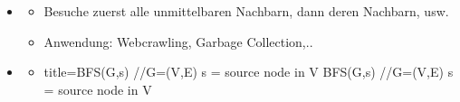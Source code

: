\documentclass[
    12pt,
    a4paper,
    ngerman,
    color=3b,%
    marginpar=false,
    colorback=false,
    leqno,
]{tudaexercise}
\begin{document}
    \begin{itemize}
        \item {}
            \begin{itemize}
                \item Besuche zuerst alle unmittelbaren Nachbarn, dann deren Nachbarn, usw.
                \item Anwendung: Webcrawling, Garbage Collection,..
            \end{itemize}
        
        \item {}
            \begin{itemize}
                \item[]
                    \begin{ccode}[autogobble,escapeinside=||]{title={BFS(G,s) //G=(V,E) s = source node in V}}
                        BFS(G,s) //G=(V,E) s = source node in V


\end{ccode}
\end{itemize}
\end{itemize}
\end{document}
